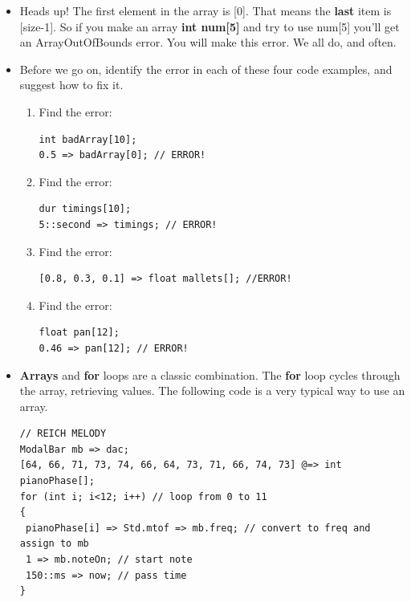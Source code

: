 \documentclass{article}
\begin{document}
\begin{itemize}
\begin{lstlisting}
TubeBell m => dac;
pentatonic[0] => m.freq;
1 => m.noteOn;
1::second => now;
pentatonic[1] => m.freq;
1 => m.noteOn;
1::second => now;
\end{lstlisting}

\item Heads up! The first element in the array is [0]. That means the \textbf{last} item is [size-1]. So if you make an array
\textbf{int num[5]} and try to use num[5] you'll get an ArrayOutOfBounds error. You will make this error. We all do, and often.

\item Before we go on, identify the error in each of these four code examples, and suggest how to fix it.

\begin {enumerate}
\item Find the error:

\begin{lstlisting}
int badArray[10];
0.5 => badArray[0]; // ERROR!
\end{lstlisting}

\item Find the error:

\begin{lstlisting}
dur timings[10];
5::second => timings; // ERROR!
\end{lstlisting}

\item Find the error:

\begin{lstlisting}
[0.8, 0.3, 0.1] => float mallets[]; //ERROR!
\end{lstlisting}

\item Find the error:

\begin{lstlisting}
float pan[12];
0.46 => pan[12]; // ERROR!
\end{lstlisting}

\end {enumerate}

\item \textbf{Arrays} and \textbf{for} loops are a classic combination. The 
\textbf{for} loop cycles through the array, retrieving values.
The following code is a very typical way to use an array.

\begin{lstlisting}
// REICH MELODY
ModalBar mb => dac;
[64, 66, 71, 73, 74, 66, 64, 73, 71, 66, 74, 73] @=> int pianoPhase[];
for (int i; i<12; i++) // loop from 0 to 11
{
 pianoPhase[i] => Std.mtof => mb.freq; // convert to freq and assign to mb
 1 => mb.noteOn; // start note
 150::ms => now; // pass time
}
\end{lstlisting}


\end{itemize}
\end{document}
